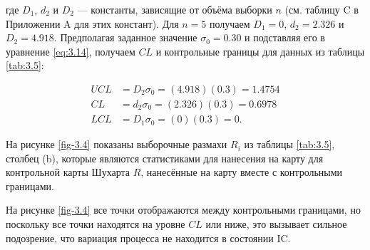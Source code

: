 где \(D_1\), \(d_2\) и \(D_2\) — константы, зависящие от объёма выборки \(n\) (см. таблицу C в Приложении A для этих констант). Для \(n = 5\) получаем \(D_1 = 0\), \(d_2 = 2.326\) и \(D_2 = 4.918\). Предполагая заданное значение \(\sigma_0 = 0.30\) и подставляя его в уравнение \eqref{eq:3.14}, получаем \(CL\) и контрольные границы для данных из таблицы \ref{tab:3.5}:

\[
\begin{aligned}
	UCL &= D_2\sigma_0 = (4.918)(0.3) = 1.4754 \\
	CL &= d_2\sigma_0 = (2.326)(0.3) = 0.6978 \\
	LCL &= D_1\sigma_0 = (0)(0.3) = 0.
\end{aligned}
\]

На рисунке \ref{fig-3.4} показаны выборочные размахи \(R_i\) из таблицы \ref{tab:3.5}, столбец (b), которые являются статистиками для нанесения на карту для контрольной карты Шухарта \(R\), нанесённые на карту вместе с контрольными границами.

На рисунке \ref{fig-3.4} все точки отображаются между контрольными границами, но поскольку все точки находятся на уровне \(CL\) или ниже, это вызывает сильное подозрение, что вариация процесса не находится в состоянии IC.

